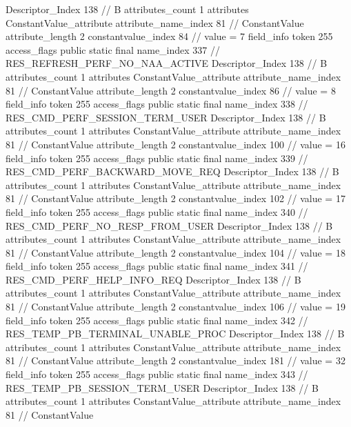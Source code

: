 {{{{{				Descriptor_Index	138		// B
				attributes_count	1
				attributes {
				ConstantValue_attribute {
					attribute_name_index	81		// ConstantValue
					attribute_length	2
					constantvalue_index	84		// value = 7
				}
				}
			}
			field_info {
				token	255
				access_flags	public static final
				name_index	337		// RES_REFRESH_PERF_NO_NAA_ACTIVE
				Descriptor_Index	138		// B
				attributes_count	1
				attributes {
				ConstantValue_attribute {
					attribute_name_index	81		// ConstantValue
					attribute_length	2
					constantvalue_index	86		// value = 8
				}
				}
			}
			field_info {
				token	255
				access_flags	public static final
				name_index	338		// RES_CMD_PERF_SESSION_TERM_USER
				Descriptor_Index	138		// B
				attributes_count	1
				attributes {
				ConstantValue_attribute {
					attribute_name_index	81		// ConstantValue
					attribute_length	2
					constantvalue_index	100		// value = 16
				}
				}
			}
			field_info {
				token	255
				access_flags	public static final
				name_index	339		// RES_CMD_PERF_BACKWARD_MOVE_REQ
				Descriptor_Index	138		// B
				attributes_count	1
				attributes {
				ConstantValue_attribute {
					attribute_name_index	81		// ConstantValue
					attribute_length	2
					constantvalue_index	102		// value = 17
				}
				}
			}
			field_info {
				token	255
				access_flags	public static final
				name_index	340		// RES_CMD_PERF_NO_RESP_FROM_USER
				Descriptor_Index	138		// B
				attributes_count	1
				attributes {
				ConstantValue_attribute {
					attribute_name_index	81		// ConstantValue
					attribute_length	2
					constantvalue_index	104		// value = 18
				}
				}
			}
			field_info {
				token	255
				access_flags	public static final
				name_index	341		// RES_CMD_PERF_HELP_INFO_REQ
				Descriptor_Index	138		// B
				attributes_count	1
				attributes {
				ConstantValue_attribute {
					attribute_name_index	81		// ConstantValue
					attribute_length	2
					constantvalue_index	106		// value = 19
				}
				}
			}
			field_info {
				token	255
				access_flags	public static final
				name_index	342		// RES_TEMP_PB_TERMINAL_UNABLE_PROC
				Descriptor_Index	138		// B
				attributes_count	1
				attributes {
				ConstantValue_attribute {
					attribute_name_index	81		// ConstantValue
					attribute_length	2
					constantvalue_index	181		// value = 32
				}
				}
			}
			field_info {
				token	255
				access_flags	public static final
				name_index	343		// RES_TEMP_PB_SESSION_TERM_USER
				Descriptor_Index	138		// B
				attributes_count	1
				attributes {
				ConstantValue_attribute {
					attribute_name_index	81		// ConstantValue
}}}}}}}

